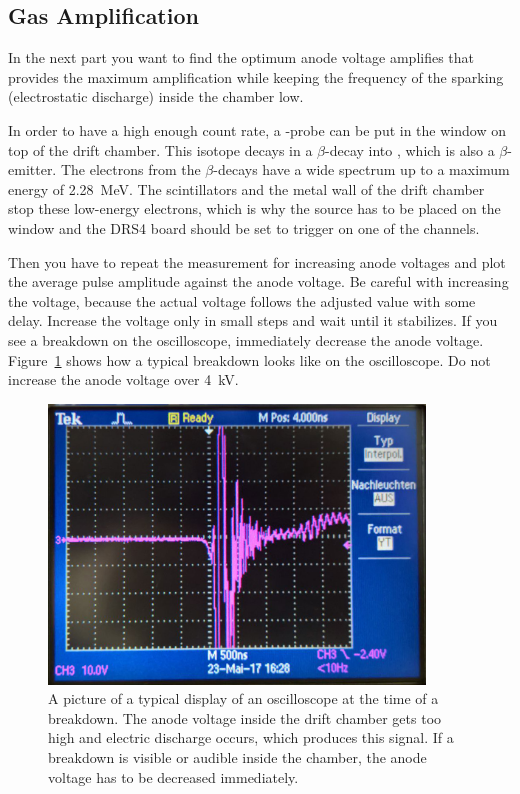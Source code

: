 \documentclass[12pt]{article}
\begin{document}
\subsection{Gas Amplification}
In the next part you want to find the optimum anode voltage amplifies that provides the maximum amplification while keeping the frequency of the sparking (electrostatic discharge) inside the chamber low. 

In order to have a high enough count rate, a  -probe can be put in the window on top of the drift chamber. This isotope decays in a $\beta$-decay into , which is also a $\beta$-emitter. The electrons from the $\beta$-decays have a wide spectrum up to a maximum energy of \SI{2.28}{\mega\electronvolt}. The scintillators and the metal wall of the drift chamber stop these low-energy electrons, which is why the source has to be placed on the window and the DRS4 board should be set to trigger on one of the channels.


Then you have to repeat the measurement for increasing anode voltages and plot the average pulse amplitude against the anode voltage. Be careful with increasing the voltage, because the actual voltage follows the adjusted value with some delay. Increase the voltage only in small steps and wait until it stabilizes. If you see a breakdown on the oscilloscope, immediately decrease the anode voltage. Figure~\ref{fig:breakdown} shows how a typical breakdown looks like on the oscilloscope. Do not increase the anode voltage over \SI{4}{\kilo\volt}. 

\begin{figure}[h]
\includegraphics[width=10cm]{pics/breakdown}
\centering
\caption{A picture of a typical display of an oscilloscope at the time of a breakdown. The anode voltage inside the drift chamber gets too high and electric discharge occurs, which produces this signal. If a breakdown is visible or audible inside the chamber, the anode voltage has to be decreased immediately.}
\label{fig:breakdown}
\end{figure}
\end{document}
